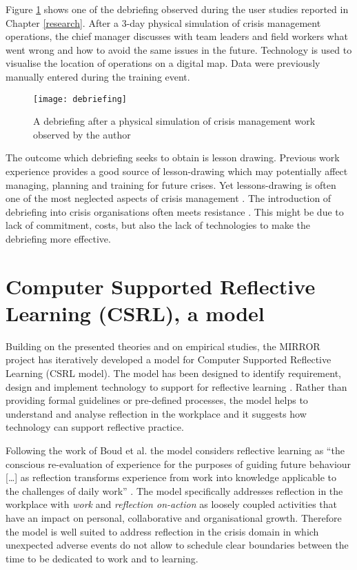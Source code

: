 Figure \ref{fig:debriefing-example} shows one of the debriefing observed during the user studies reported in Chapter \ref{research}. After a 3-day physical simulation of crisis management operations, the chief manager discusses with team leaders and field workers what went wrong and how to avoid the same issues in the future. Technology is used to visualise the location of operations on a digital map. Data were previously manually entered during the training event.

\begin{figure}
	[tbh] \centering 
	\texttt{[image: debriefing]} \caption{A debriefing after a physical simulation of crisis management work observed by the author} \label{fig:debriefing-example} 
\end{figure}

The outcome which debriefing seeks to obtain is lesson drawing. Previous work experience provides a good source of lesson-drawing which may potentially affect managing, planning and training for future crises. Yet lessons-drawing is often one of the most neglected aspects of crisis management \autocites{Lagadec:1997js}{Stern:1997eb}. The introduction of debriefing into crisis organisations often meets resistance \autocite{Lagadec:1997js}. This might be due to lack of commitment, costs, but also the lack of technologies to make the debriefing more effective.

\section{Computer Supported Reflective Learning (CSRL), a model}\label{computer-supported-reflective-learning-a-model}

Building on the presented theories and on empirical studies, the MIRROR project has iteratively developed a model for Computer Supported Reflective Learning (CSRL model). The model has been designed to identify requirement, design and implement technology to support for reflective learning \autocite{Krogstie:2013kf}. Rather than providing formal guidelines or pre-defined processes, the model helps to understand and analyse reflection in the workplace and it suggests how technology can support reflective practice.

Following the work of Boud et al. \autocite*{boud1985reflection} the model considers reflective learning as ``the conscious re-evaluation of experience for the purposes of guiding future behaviour {[}\ldots{}{]} as reflection transforms experience from work into knowledge applicable to the challenges of daily work'' \autocite{Krogstie:2013kf}. The model specifically addresses reflection in the workplace with \emph{work} and \emph{reflection on-action} as loosely coupled activities that have an impact on personal, collaborative and organisational growth. Therefore the model is well suited to address reflection in the crisis domain in which unexpected adverse events do not allow to schedule clear boundaries between the time to be dedicated to work and to learning.

